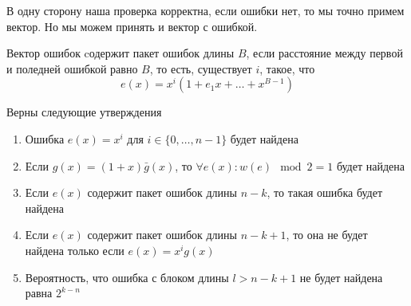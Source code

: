 \begin{remark}
В одну сторону наша проверка корректна, если ошибки нет, то мы точно примем вектор.
Но мы можем принять и вектор с ошибкой. 
\end{remark}

\begin{definition}
Вектор ошибок cодержит пакет ошибок длины $B$, если расстояние между
первой и поледней ошибкой равно $B$, то есть, существует $i$, такое, что
$$e(x) = x^i (1 + e_1 x + \ldots + x^{B-1})$$
\end{definition}

\begin{proposition}
Верны следующие утверждения
\begin{enumerate}
\item Ошибка $e(x) = x^i$ для $i \in \{0, \ldots, n-1\}$ будет найдена
\item Если $g(x) = (1+x) \bar{g}(x)$, то $\forall e(x) \colon w(e) \mod 2 = 1$
 будет найдена
\item Если $e(x)$ содержит пакет ошибок длины $n-k$, то такая ошибка
будет найдена
\item Если $e(x)$ содержит пакет ошибок длины $n-k+1$, то она не будет найдена
только если $e(x) = x^i g(x)$
\item Вероятность, что ошибка с блоком длины $l > n-k+1$ не будет найдена 
равна $2^{k-n}$
\end{enumerate}
\end{proposition}

